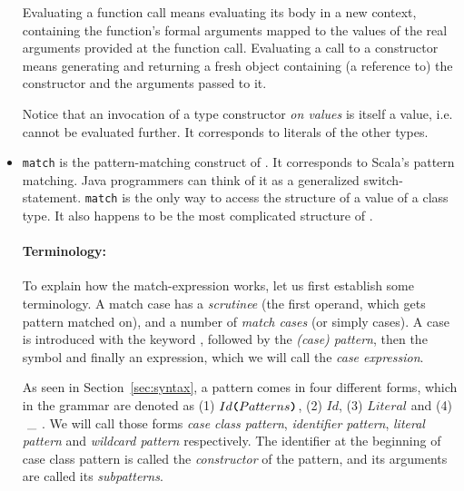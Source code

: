 \begin{itemize}
        Evaluating a function call means evaluating its body in a new context,
        containing the function's formal arguments mapped to the values of the real
        arguments provided at the function call.
        Evaluating a call to a constructor means generating and returning a fresh object
        containing (a reference to) the constructor and the arguments passed to it.

        Notice that an invocation of a type constructor \emph{on values} is itself a value,
        i.e. cannot be evaluated further. It corresponds to literals of the other types.

    \item \lstinline{match} is the pattern-matching construct of \langname.
        It corresponds to Scala's pattern matching. Java programmers can think of
        it as a generalized switch-statement.
        \lstinline{match} is the only way to access the structure of a value
        of a class type. It also happens to be the most complicated structure
        of \langname.
        
        \paragraph{Terminology:} To explain how the match-expression works, let us first establish some
        terminology. A match case has a \emph{scrutinee} (the first operand,
        which gets pattern matched on), and a number of \emph{match cases}
        (or simply cases). A case is introduced with the keyword ,
        followed by the \emph{(case) pattern}, then the symbol \gt{=>} and finally
        an expression, which we will call the \emph{case expression}.

        As seen in Section~\ref{sec:syntax}, a pattern comes in four different forms,
        which in the grammar are denoted as
        (1) $Id\text{\tt \textbf{(}}Patterns\text{\tt \textbf{)}}$, (2) $Id$, (3) $Literal$ and \hbox{(4) $~\_~$}.
        We will call those forms \emph{case class pattern}, \emph{identifier pattern},
        \emph{literal pattern} and \emph{wildcard pattern} respectively.
        The identifier at the beginning of case class pattern is called the \emph{constructor} of the pattern,
        and its arguments are called its \emph{subpatterns}.


\end{itemize}

